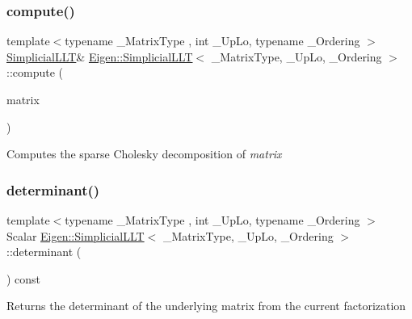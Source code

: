 \subsubsection{\texorpdfstring{compute()}{compute()}}
{\footnotesize\ttfamily template$<$typename \+\_\+\+Matrix\+Type , int \+\_\+\+Up\+Lo, typename \+\_\+\+Ordering $>$ \\
\mbox{\hyperlink{class_eigen_1_1_simplicial_l_l_t}{Simplicial\+L\+LT}}\& \mbox{\hyperlink{class_eigen_1_1_simplicial_l_l_t}{Eigen\+::\+Simplicial\+L\+LT}}$<$ \+\_\+\+Matrix\+Type, \+\_\+\+Up\+Lo, \+\_\+\+Ordering $>$\+::compute (\begin{DoxyParamCaption}\item[{const Matrix\+Type \&}]{matrix }\end{DoxyParamCaption})\hspace{0.3cm}{\ttfamily [inline]}}

Computes the sparse Cholesky decomposition of {\itshape matrix} \mbox{\label{class_eigen_1_1_simplicial_l_l_t_a956595848e6fac7a389d091b3fdc9567}} 
\subsubsection{\texorpdfstring{determinant()}{determinant()}}
{\footnotesize\ttfamily template$<$typename \+\_\+\+Matrix\+Type , int \+\_\+\+Up\+Lo, typename \+\_\+\+Ordering $>$ \\
Scalar \mbox{\hyperlink{class_eigen_1_1_simplicial_l_l_t}{Eigen\+::\+Simplicial\+L\+LT}}$<$ \+\_\+\+Matrix\+Type, \+\_\+\+Up\+Lo, \+\_\+\+Ordering $>$\+::determinant (\begin{DoxyParamCaption}{ }\end{DoxyParamCaption}) const\hspace{0.3cm}{\ttfamily [inline]}}

\begin{DoxyReturn}{Returns}
the determinant of the underlying matrix from the current factorization 
\end{DoxyReturn}
\mbox{\label{class_eigen_1_1_simplicial_l_l_t_a8a140b34b08df74c7426ee29b986b228}} 
